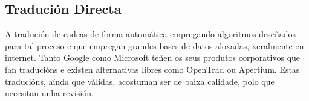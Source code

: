 \subsection{Tradución Directa}
A tradución de cadeas de forma automática empregando algoritmos deseñados para tal proceso e que empregan grandes bases de datos aloxadas, xeralmente en internet. Tanto Google como Microsoft teñen os seus produtos corporativos que fan traducións e existen alternativas libres como OpenTrad ou Apertium. Estas traducións, aínda que válidas, acostuman ser de baixa calidade, polo que necesitan unha revisión.
